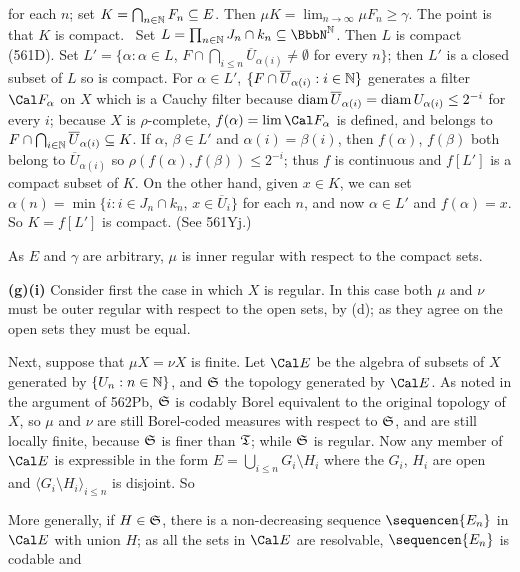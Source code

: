 {\noindent for each $n$;  set $K=\bigcap_{n\in\Bbb N}F_n\subseteq E$.   Then
$\mu K=\lim_{n\to\infty}\mu F_n\ge\gamma$.   The point is that $K$ is
compact.   \Prf\ Set $L=\prod_{n\in\Bbb N}J_n\cap k_n\subseteq\NN$.
Then $L$ is compact (561D).   Set 
$L'=\{\alpha:\alpha\in L$, 
$F\cap\bigcap_{i\le n}\overline{U}_{\alpha(i)}\ne\emptyset$ 
for every $n\}$;
then $L'$ is a closed subset of $L$ so is compact.   For $\alpha\in L'$,
$\{F\cap\overline{U}_{\alpha(i)}:i\in\Bbb N\}$ generates a filter 
$\Cal F_{\alpha}$ on $X$ which
is a Cauchy filter because $\mathop{\text{diam}}\overline{U}_{\alpha(i)}
=\mathop{\text{diam}} U_{\alpha(i)}\le 2^{-i}$ for every $i$;  because $X$ is
$\rho$-complete, $f(\alpha)=\lim\Cal F_{\alpha}$ is defined, and belongs to
$F\cap\bigcap_{i\in\Bbb N}\overline{U}_{\alpha(i)}\subseteq K$.   If
$\alpha$, $\beta\in L'$ and $\alpha(i)=\beta(i)$, then
$f(\alpha)$, $f(\beta)$ both belong to $\overline{U}_{\alpha(i)}$ so
$\rho(f(\alpha),f(\beta))\le 2^{-i}$;  thus $f$ is continuous and
$f[L']$ is a compact subset of $K$.
On the other hand, given $x\in K$, we can set
$\alpha(n)=\min\{i:i\in J_n\cap k_n$, $x\in\overline{U}_i\}$ for each
$n$, and now $\alpha\in L'$ and $f(\alpha)=x$.   So $K=f[L']$ is compact.
(See 561Yj.)\ \Qed

As $E$ and $\gamma$ are arbitrary, $\mu$ is inner regular with respect to
the compact sets.

\medskip

{\bf (g)(i)} Consider first the case in which $X$ is regular.   In this
case both $\mu$ and $\nu$ must be outer regular with respect to the open
sets, by (d);  as they agree on the open sets they must be equal.

\medskip

 Next, suppose that $\mu X=\nu X$ is finite.
Let $\Cal E$ be the algebra of subsets of $X$
generated by $\{U_n:n\in\Bbb N\}$, and $\frak S$ the topology generated by
$\Cal E$.   As noted in the argument of 562Pb, $\frak S$ is codably Borel
equivalent to the original topology of $X$, so $\mu$ and $\nu$ are still
Borel-coded measures with respect to $\frak S$, and are still locally
finite, because $\frak S$ is finer than $\frak T$;  while $\frak S$ is
regular.   Now any member of $\Cal E$ is expressible in the form
$E=\bigcup_{i\le n}G_i\setminus H_i$ where the $G_i$, $H_i$ are open and
$\langle G_i\setminus H_i\rangle_{i\le n}$ is disjoint.   So


\noindent More generally, if $H\in\frak S$, there is a non-decreasing
sequence $\sequencen{E_n}$
in $\Cal E$ with union $H$;  as all the sets in $\Cal E$ are resolvable,
$\sequencen{E_n}$ is codable and

}
